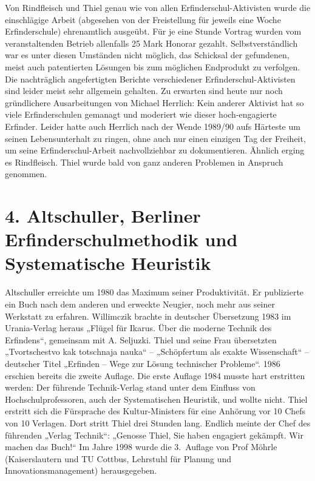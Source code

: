 \documentclass[12pt,a4paper]{article}
\begin{document}
Von Rindfleisch und Thiel genau wie von allen Erfinderschul-Aktivisten wurde
die einschlägige Arbeit (abgesehen von der Freistellung für jeweils eine Woche
Erfinderschule) ehrenamtlich ausgeübt. Für je eine Stunde Vortrag wurden vom
veranstaltenden Betrieb allenfalls 25 Mark Honorar gezahlt. Selbstverständlich
war es unter diesen Umständen nicht möglich, das Schicksal der gefundenen,
meist auch patentierten Lösungen bis zum möglichen Endprodukt zu verfolgen. Die
nachträglich angefertigten Berichte verschiedener Erfinderschul-Aktivisten sind
leider meist sehr allgemein gehalten. Zu erwarten sind heute nur noch
gründlichere Ausarbeitungen von Michael Herrlich: Kein anderer Aktivist hat so
viele Erfinderschulen gemanagt und moderiert wie dieser hoch-engagierte
Erfinder.  Leider hatte auch Herrlich nach der Wende 1989/90 aufs Härteste
um seinen Lebensunterhalt zu ringen, ohne auch nur einen einzigen Tag der
Freiheit, um seine Erfinderschul-Arbeit nachvollziehbar zu dokumentieren.
Ähnlich erging es Rindfleisch. Thiel wurde bald von ganz anderen Problemen in
Anspruch genommen.

\section*{4. Altschuller, Berliner Erfinderschulmethodik und\\ Systematische
  Heuristik} 

Altschuller erreichte um 1980 das Maximum seiner Produktivität. Er publizierte
ein Buch nach dem anderen und erweckte Neugier, noch mehr aus seiner Werkstatt
zu erfahren. Willimczik brachte in deutscher Übersetzung 1983 im Urania-Verlag
heraus „Flügel für Ikarus. Über die moderne Technik des Erfindens“, gemeinsam
mit A. Seljuzki. Thiel und seine Frau übersetzten „Tvortschestvo kak totschnaja
nauka“ – „Schöpfertum als exakte Wissenschaft“ – deutscher Titel „Erfinden –
Wege zur Lösung technischer Probleme“. 1986 erschien bereits die zweite
Auflage.  Die erste Auflage 1984 musste hart erstritten werden: Der führende
Technik-Verlag stand unter dem Einfluss von Hochschulprofessoren, auch der
Systematischen Heuristik, und wollte nicht. Thiel erstritt sich die Fürsprache
des Kultur-Ministers für eine Anhörung vor 10 Chefs von 10 Verlagen. Dort
stritt Thiel drei Stunden lang. Endlich meinte der Chef des führenden „Verlag
Technik“: „Genosse Thiel, Sie haben engagiert gekämpft. Wir machen das Buch!“
Im Jahre 1998 wurde die 3.~Auflage von Prof Möhrle (Kaiserslautern und TU
Cottbus, Lehrstuhl für Planung und Innovationsmanagement) herausgegeben.
\end{document}
